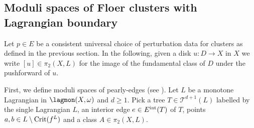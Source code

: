 
\subsection{Moduli spaces of Floer clusters with Lagrangian boundary} Let $p\in E$ be a consistent universal choice of perturbation data for clusters as defined in the previous section. In the following, given a disk $u: D\to X$ in $X$ we write $[u]\in \pi_2(X,L)$ for the image of the fundamental class of $D$ under the pushforward of $u$.

First, we define moduli spaces of pearly-edges (see \cite{Bi-Co:Yasha-fest}). Let $L$ be a monotone Lagrangian in $\lagmon(X,\omega)$ and $d\geq 1$. Pick a tree $T\in \mathcal{T}^{d+1}(L)$ labelled by the single Lagrangian $L$, an interior edge $e\in E^\textnormal{int}(T)$ of $T$, points $a,b\in L\setminus\textnormal{Crit}(f^L)$ and a class $A\in \pi_2(X,L)$.

